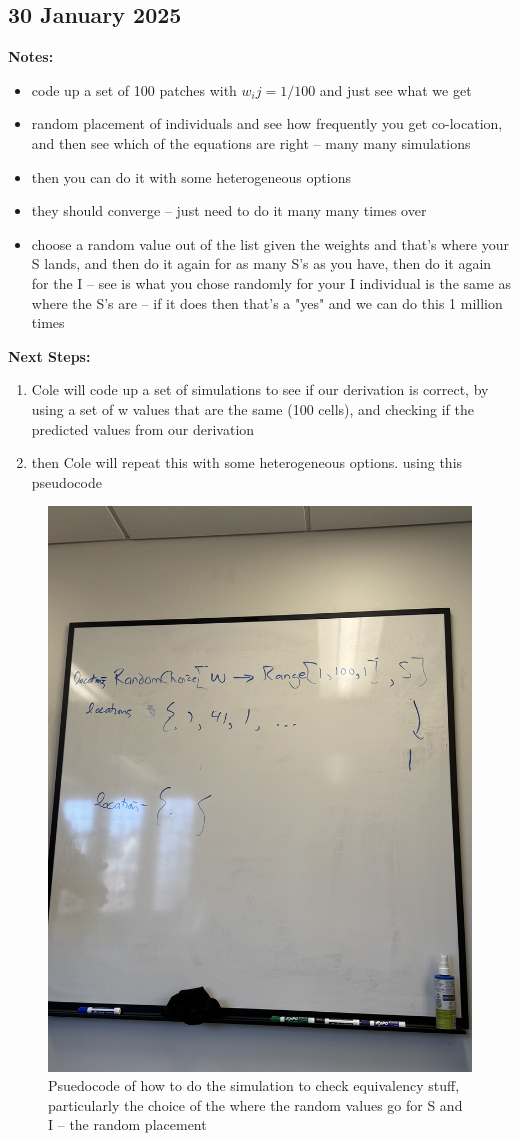 \documentclass[12pt]{article}%
\begin{document}
\subsection{30 January 2025}
\textbf{Notes:}
\begin{itemize}
    \item code up a set of 100 patches with $w_ij= 1/100$ and just see what we get 
    \item random placement of individuals and see how frequently you get co-location, and then see which of the equations are right -- many many simulations
    \item then you can do it with some heterogeneous options 
    \item they should converge -- just need to do it many many times over 
    \item choose a random value out of the list given the weights and that's where your S lands, and then do it again for as many S's as you have, then do it again for the I -- see is what you chose randomly for your I individual is the same as where the S's are -- if it does then that's a "yes" and we can do this 1 million times 
\end{itemize}
\textbf{Next Steps:}
\begin{enumerate}
    \item Cole will code up a set of simulations to see if our derivation is correct, by using a set of w values that are the same (100 cells), and checking if the predicted values from our derivation 
    \item then Cole will repeat this with some heterogeneous options. using this pseudocode 
\end{enumerate}
\begin{figure}[!hpt]
    \centering
    \includegraphics[width=0.65\linewidth]{notes-figs/20250130-pseudocode.jpg}
    \caption{Psuedocode of how to do the simulation to check equivalency stuff, particularly the choice of the where the random values go for S and I -- the random placement}
\end{figure}
\end{document}
